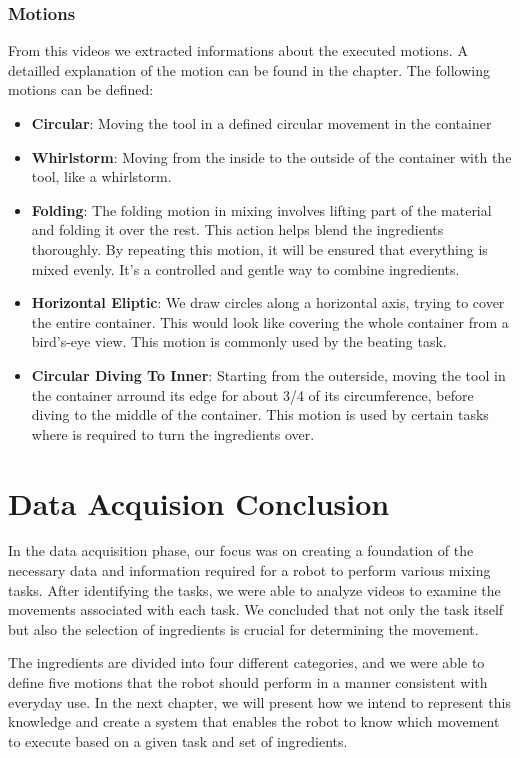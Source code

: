 \subsubsection{Motions}
	From this videos we extracted informations about the executed motions. A detailled explanation of the motion can be found in the  chapter. The following motions can be defined:
	\begin{itemize}
		\item \textbf{Circular}: Moving the tool in a defined circular movement in the container
		\item \textbf{Whirlstorm}: Moving from the inside to the outside of the container with the tool, like a whirlstorm.
		\item \textbf{Folding}: The folding motion in mixing involves lifting part of the material and folding it over the rest. This action helps blend the ingredients thoroughly. By repeating this motion, it will be ensured that everything is mixed evenly. It's a controlled and gentle way to combine ingredients.
		\item \textbf{Horizontal Eliptic}: We draw circles along a horizontal axis, trying to cover the entire container. This would look like covering the whole container from a bird's-eye view. This motion is commonly used by the beating task.
		\item \textbf{Circular Diving To Inner}: Starting from the outerside, moving the tool in the container arround its edge for about 3/4 of its circumference, before diving to the middle of the container. This motion is used by certain tasks where is required to turn the ingredients over.
	\end{itemize}

\section{Data Acquision Conclusion}

In the data acquisition phase, our focus was on creating a foundation of the necessary data and information required for a robot to perform various mixing tasks. After identifying the tasks, we were able to analyze videos to examine the movements associated with each task. We concluded that not only the task itself but also the selection of ingredients is crucial for determining the movement.

The ingredients are divided into four different categories, and we were able to define five motions that the robot should perform in a manner consistent with everyday use. In the next chapter, we will present how we intend to represent this knowledge and create a system that enables the robot to know which movement to execute based on a given task and set of ingredients.
\newpage